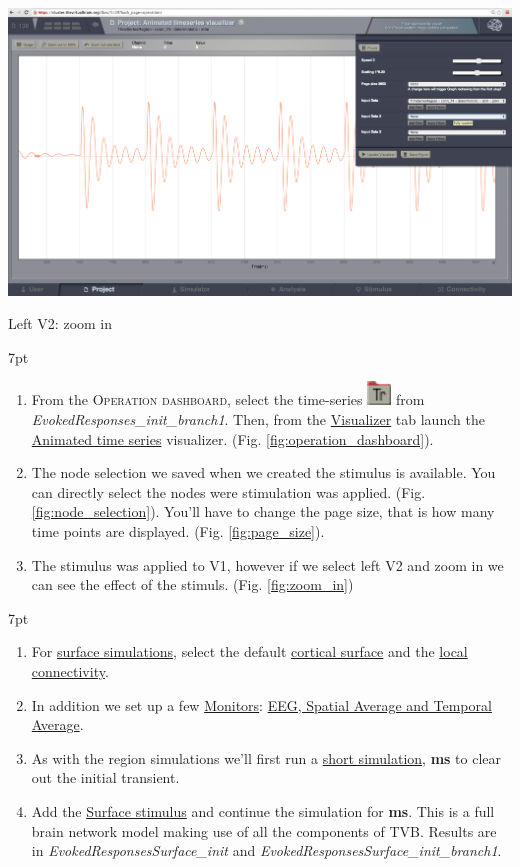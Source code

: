 \documentclass{tufte-handout}
\newenvironment{formal}{%
  \def\FrameCommand{%
    \hspace{1pt}%
    {\color{DarkBlue}\vrule width 2pt}%
    {\color{formalshade}\vrule width 4pt}%
    \colorbox{formalshade}%
  }%
  \MakeFramed{\advance\hsize-\width\FrameRestore}%
  \noindent\hspace{-4.55pt}%
  \begin{adjustwidth}{}{7pt}%
  \vspace{2pt}\vspace{2pt}%
}
{%
  \vspace{2pt}\end{adjustwidth}\endMakeFramed%
}
\newenvironment{simulation}{%
  \def\FrameCommand{%
    \hspace{1pt}%
    {\color{ForestGreen}\vrule width 2pt}%
    {\color{simulationshade}\vrule width 4pt}%
    \colorbox{simulationshade}%
  }%
  \MakeFramed{\advance\hsize-\width\FrameRestore}%
  \noindent\hspace{-4.55pt}%
  \begin{adjustwidth}{}{7pt}%
  \vspace{2pt}\vspace{2pt}%
}
{%
  \vspace{2pt}\end{adjustwidth}\endMakeFramed%
}
\begin{document}
\begin{marginfigure}
  \includegraphics[width=\linewidth]{Handout_UI_HeterogenousModelAndStimulation_ZoomIn}%
  \caption{Left V2: zoom in}%
  \label{fig:zoom_in}%
\end{marginfigure}
\begin{formal}
\begin{enumerate}
\item From the \textsc{Operation dashboard}, select  the time-series  \includegraphics[width=0.05\textwidth]{nodeTimeSeriesRegion.png} from \textit{EvokedResponses\_init\_branch1}. Then, from the \underline{Visualizer} tab launch the \underline{Animated time series} visualizer. (Fig. \ref{fig:operation_dashboard}).
\item The node selection we saved when we created the stimulus is available. You can directly select the nodes were stimulation was applied. (Fig. \ref{fig:node_selection}). 
You'll have to change the page size, that is how many time points are displayed. (Fig. \ref{fig:page_size}).
\item The stimulus was applied to V1, however if we select left V2 and zoom in we can see the effect of the stimuls. (Fig. \ref{fig:zoom_in})
\end{enumerate}
\end{formal}

\begin{simulation}
\begin{enumerate}
\item For \underline{surface simulations}, select the default \underline{cortical surface} and the \underline{local connectivity}.
\item In addition we set up a few \underline{Monitors}: \underline{EEG, Spatial Average and Temporal Average}.
\item As with the region simulations we'll first run a \underline{short simulation}, \textbf{\unit[200]{ms}} to clear out the initial transient.
\item Add the \underline{Surface stimulus} and continue the simulation for \textbf{\unit[4000]{ms}}. This is a full brain network model making use of all the components of TVB. Results are in \textit{EvokedResponsesSurface\_init} and \textit{EvokedResponsesSurface\_init\_branch1}.
\end{enumerate}
\end{simulation}
\end{document}
